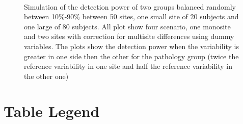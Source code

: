 \documentclass[authoryear]{elsarticle}
\begin{document}
\begin{figure}[t]
   \centering
    \captionsetup[subfloat]{labelformat=empty}
     \\
     \tiny Simulation of the detection power of two groups balanced randomly between 10\%-90\% between 50 sites, one small site of 20 subjects and one large of 80 subjects. All plot show four scenario, one monosite and two sites with correction for multisite differences using dummy variables. The plots show the detection power when the variability is greater in one side then the other for the pathology group (twice the reference variability in one site and half the reference variability in the other one)
\end{figure}




 
\section{Table Legend}
\end{document}
